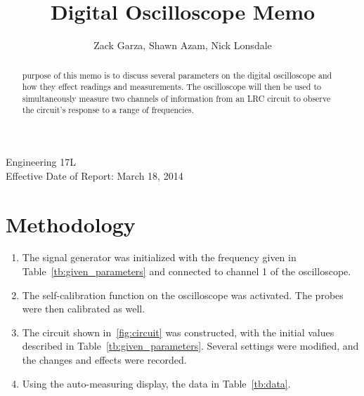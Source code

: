 \documentclass[twocolumn,english]{IEEEtran}
\theoremstyle{plain}
\theoremstyle{plain}
\begin{document}
\title{Digital Oscilloscope Memo}


\author{Zack Garza, Shawn Azam, Nick Lonsdale}


\IEEEspecialpapernotice
{Engineering 17L\\
Effective Date of Report: March 18, 2014}


\maketitle
\begin{abstract}
 purpose of this memo is to discuss several parameters on the digital oscilloscope and how they effect readings and measurements. The oscilloscope will then be used to simultaneously measure two channels of information from an LRC circuit to observe the circuit's response to a range of frequencies.
\end{abstract}

\tableofcontents

\section{Methodology}
\begin{enumerate}
 \item The signal generator was initialized with the frequency given in Table~\ref{tb:given_parameters} and connected to channel 1 of the oscilloscope.
 \item The self-calibration function on the oscilloscope was activated. The probes were then calibrated as well.
 \item The circuit shown in~\ref{fig:circuit} was constructed, with the initial values described in Table~\ref{tb:given_parameters}. Several settings were modified, and the changes and effects were recorded.
 \item Using the auto-measuring display, the data in Table~\ref{tb:data}.
\end{enumerate}
\end{document}

